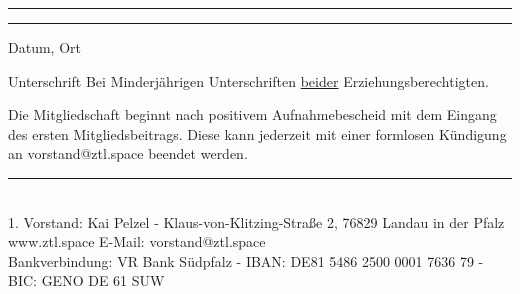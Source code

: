 \documentclass[a4paper, 11pt]{scrartcl}
\begin{document}
\vspace{15pt}
\par
\noindent\rule{5cm}{.4pt}\hfill\rule{5.1cm}{.4pt}\par
\noindent\parbox[t]{5cm}{Datum, Ort}\hfill\parbox[t]{5cm}{Unterschrift {\tiny Bei Minderjährigen Unterschriften \underline{beider} Erziehungsberechtigten.}}
\vspace{15pt}

Die Mitgliedschaft beginnt nach positivem Aufnahmebescheid mit dem Eingang des ersten Mitgliedsbeitrags. Diese kann jederzeit mit einer formlosen Kündigung an vorstand@ztl.space beendet werden.

\vspace{15pt}
\begin{center}
\rule{15cm}{.4pt}\\ 
1. Vorstand: Kai Pelzel - Klaus-von-Klitzing-Straße 2, 76829 Landau in der Pfalz \\
www.ztl.space E-Mail: vorstand@ztl.space \\
Bankverbindung: VR Bank Südpfalz - IBAN: DE81 5486 2500 0001 7636 79 - BIC: GENO DE 61 SUW
\end{center}
\end{document}
